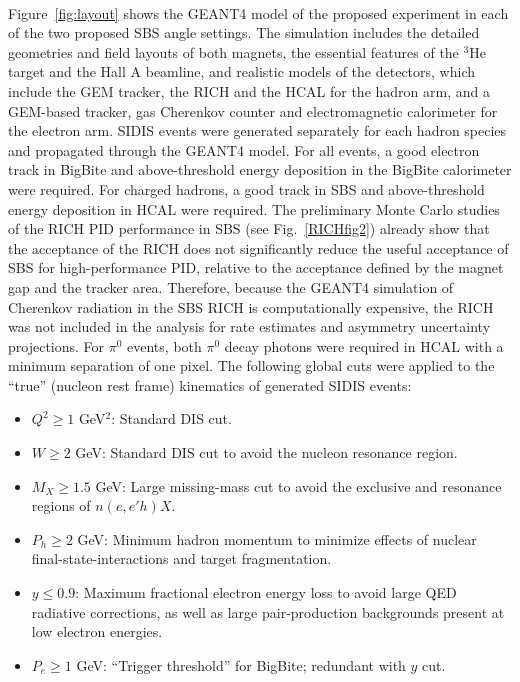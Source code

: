 \paragraph{}
Figure~\ref{fig:layout} shows the GEANT4 model of the proposed experiment in each of the two proposed SBS angle settings. The simulation includes the detailed geometries and field layouts of both magnets, the essential features of the $^3$He target and the Hall A beamline, and realistic models of the detectors, which include the GEM tracker, the RICH and the HCAL for the hadron arm, and a GEM-based tracker, gas Cherenkov counter and electromagnetic calorimeter for the electron arm. SIDIS events were generated separately for each hadron species and propagated through the GEANT4 model. For all events, a good electron track in BigBite and above-threshold energy deposition in the BigBite calorimeter were required. For charged hadrons, a good track in SBS and above-threshold energy deposition in HCAL were required. The preliminary Monte Carlo studies of the RICH PID performance in SBS (see Fig.~\ref{RICHfig2}) already show that the acceptance of the RICH does not significantly reduce the useful acceptance of SBS for high-performance PID, relative to the acceptance defined by the magnet gap and the tracker area. Therefore, because the GEANT4 simulation of Cherenkov radiation in the SBS RICH is computationally expensive, the RICH was not included in the analysis for rate estimates and asymmetry uncertainty projections.  For $\pi^0$ events, both $\pi^0$ decay photons were required in HCAL with a minimum separation of one pixel. The following global cuts were applied to the ``true'' (nucleon rest frame) kinematics of generated SIDIS events:
\begin{itemize}
\item $Q^2 \ge 1$ GeV$^2$: Standard DIS cut. 
\item $W \ge 2$ GeV: Standard DIS cut to avoid the nucleon resonance region.
\item $M_X \ge 1.5$ GeV: Large missing-mass cut to avoid the exclusive and resonance regions of $n(e,e'h)X$.
\item $P_h \ge 2$ GeV: Minimum hadron momentum to minimize effects of nuclear final-state-interactions and target fragmentation.
\item $y \le 0.9$: Maximum fractional electron energy loss to avoid large QED radiative corrections, as well as large pair-production backgrounds present at low electron energies.
\item $P_e \ge 1$ GeV: ``Trigger threshold'' for BigBite; redundant with $y$ cut. 
\end{itemize}
